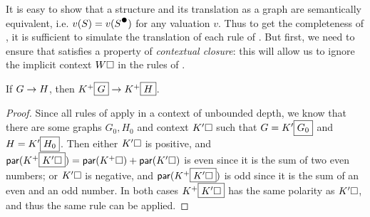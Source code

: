 It is easy to show that a structure and its translation as a graph are
semantically equivalent, i.e. $v(S) = v(\strans{S})$ for any valuation $v$. Thus
to get the completeness of , it is sufficient to simulate the
translation of each rule of . But first, we need to ensure that
 satisfies a property of \emph{contextual closure}: this will allow
us to ignore the implicit context $W\square$ in the rules of .

\begin{lemma}
  If $G \rightarrow H$, then $K^+\fbox{$G$} \rightarrow K^+\fbox{$H$}$.
\end{lemma}
\begin{proof}
  Since all rules of  apply in a context of unbounded depth, we know
  that there are some graphs $G_0, H_0$ and context $K'\square$ such that $G =
  K'\fbox{$G_0$}$ and $H = K'\fbox{$H_0$}$. Then either $K'\square$ is positive,
  and $\mathsf{par}(K^+\fbox{$K'\square$}) = \mathsf{par}(K^+\square) + \mathsf{par}(K'\square)$ is
  even since it is the sum of two even numbers; or $K'\square$ is negative, and
  $\mathsf{par}(K^+\fbox{$K'\square$})$ is odd since it is the sum of an even and an
  odd number. In both cases $K^+\fbox{$K'\square$}$ has the same polarity as
  $K'\square$, and thus the same rule can be applied.
\end{proof}

